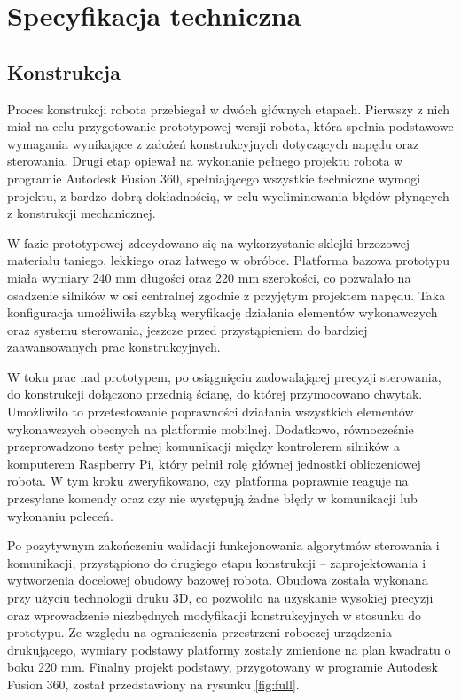 \chapter{Specyfikacja techniczna}
\label{ch:06}

\section{Konstrukcja}
Proces konstrukcji robota przebiegał w dwóch głównych etapach. Pierwszy z nich miał na celu przygotowanie prototypowej wersji robota, która spełnia podstawowe wymagania wynikające z założeń konstrukcyjnych dotyczących napędu oraz sterowania. Drugi etap opiewał na wykonanie pełnego projektu robota w programie Autodesk Fusion 360, spełniającego wszystkie techniczne wymogi projektu, z bardzo dobrą dokładnością, w celu wyeliminowania błędów płynących z konstrukcji mechanicznej.

W fazie prototypowej zdecydowano się na wykorzystanie sklejki brzozowej – materiału taniego, lekkiego oraz łatwego w obróbce. Platforma bazowa prototypu miała wymiary 240 mm długości oraz 220 mm szerokości, co pozwalało na osadzenie silników w osi centralnej zgodnie z przyjętym projektem napędu. Taka konfiguracja umożliwiła szybką weryfikację działania elementów wykonawczych oraz systemu sterowania, jeszcze przed przystąpieniem do bardziej zaawansowanych prac konstrukcyjnych.

W toku prac nad prototypem, po osiągnięciu zadowalającej precyzji sterowania, do konstrukcji dołączono przednią ścianę, do której przymocowano chwytak. Umożliwiło to przetestowanie poprawności działania wszystkich elementów wykonawczych obecnych na platformie mobilnej. Dodatkowo, równocześnie przeprowadzono testy pełnej komunikacji między kontrolerem silników a komputerem Raspberry Pi, który pełnił rolę głównej jednostki obliczeniowej robota. W tym kroku zweryfikowano, czy platforma poprawnie reaguje na przesyłane komendy oraz czy nie występują żadne błędy w komunikacji lub wykonaniu poleceń.

Po pozytywnym zakończeniu walidacji funkcjonowania algorytmów sterowania i komunikacji, przystąpiono do drugiego etapu konstrukcji – zaprojektowania i wytworzenia docelowej obudowy bazowej robota. Obudowa została wykonana przy użyciu technologii druku 3D, co pozwoliło na uzyskanie wysokiej precyzji oraz wprowadzenie niezbędnych modyfikacji konstrukcyjnych w stosunku do prototypu. Ze względu na ograniczenia przestrzeni roboczej urządzenia drukującego, wymiary podstawy platformy zostały zmienione na plan kwadratu o boku 220 mm. Finalny projekt podstawy, przygotowany w programie Autodesk Fusion 360, został przedstawiony na rysunku \ref{fig:full}.

